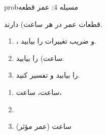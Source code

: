 \begin{PSbox}[unbreakable]{prob}{مسیله 4: عمر قطعه}

قطعات عمر  در هر ساعت) دارند.

\begin{enumerate}
\def\labelenumi{(\alph{enumi})}
\tightlist
\item
  ،  و ضریب تغییرات را بیابید.
\item
   ساعت) را بیابید.
\item
   را بیابید و تفسیر کنید.
\end{enumerate}

\PSsolution{} 

\begin{enumerate}
\def\labelenumi{(\alph{enumi})}
\item
   ساعت،  ساعت، 
\item
\item
  \PSbr{} ساعت (عمر مؤثر)
\end{enumerate}

\end{PSbox}

